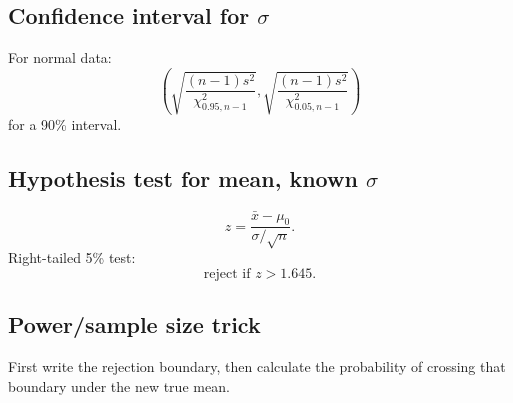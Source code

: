 \documentclass[11pt,a4paper]{article}
\begin{document}
\subsection*{Confidence interval for \(\sigma\)}
For normal data:
\[
\left(
\sqrt{\frac{(n-1)s^2}{\chi^2_{0.95,n-1}}},
\sqrt{\frac{(n-1)s^2}{\chi^2_{0.05,n-1}}}
\right)
\]
for a 90\% interval.

\subsection*{Hypothesis test for mean, known \(\sigma\)}
\[
z=\frac{\bar{x}-\mu_0}{\sigma/\sqrt{n}}.
\]
Right-tailed 5\% test:
\[
\text{reject if } z>1.645.
\]

\subsection*{Power/sample size trick}
First write the rejection boundary, then calculate the probability of crossing that boundary under the new true mean.
\end{document}
